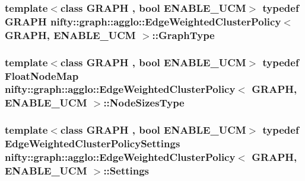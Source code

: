 \subsubsection[{Graph\+Type}]{\setlength{\rightskip}{0pt plus 5cm}template$<$class G\+R\+A\+P\+H , bool E\+N\+A\+B\+L\+E\+\_\+\+U\+C\+M$>$ typedef G\+R\+A\+P\+H {\bf nifty\+::graph\+::agglo\+::\+Edge\+Weighted\+Cluster\+Policy}$<$ G\+R\+A\+P\+H, E\+N\+A\+B\+L\+E\+\_\+\+U\+C\+M $>$\+::{\bf Graph\+Type}}\label{classnifty_1_1graph_1_1agglo_1_1EdgeWeightedClusterPolicy_a8e910f7b9d0c1baa1de7b6b1c3e58397}
\hypertarget{classnifty_1_1graph_1_1agglo_1_1EdgeWeightedClusterPolicy_a44ba54059efcb57c8c8091016fb9ee99}{}
\subsubsection[{Node\+Sizes\+Type}]{\setlength{\rightskip}{0pt plus 5cm}template$<$class G\+R\+A\+P\+H , bool E\+N\+A\+B\+L\+E\+\_\+\+U\+C\+M$>$ typedef Float\+Node\+Map {\bf nifty\+::graph\+::agglo\+::\+Edge\+Weighted\+Cluster\+Policy}$<$ G\+R\+A\+P\+H, E\+N\+A\+B\+L\+E\+\_\+\+U\+C\+M $>$\+::{\bf Node\+Sizes\+Type}}\label{classnifty_1_1graph_1_1agglo_1_1EdgeWeightedClusterPolicy_a44ba54059efcb57c8c8091016fb9ee99}
\hypertarget{classnifty_1_1graph_1_1agglo_1_1EdgeWeightedClusterPolicy_acb5f307af4f968aac09e0aa716df633a}{}
\subsubsection[{Settings}]{\setlength{\rightskip}{0pt plus 5cm}template$<$class G\+R\+A\+P\+H , bool E\+N\+A\+B\+L\+E\+\_\+\+U\+C\+M$>$ typedef {\bf Edge\+Weighted\+Cluster\+Policy\+Settings} {\bf nifty\+::graph\+::agglo\+::\+Edge\+Weighted\+Cluster\+Policy}$<$ G\+R\+A\+P\+H, E\+N\+A\+B\+L\+E\+\_\+\+U\+C\+M $>$\+::{\bf Settings}}\label{classnifty_1_1graph_1_1agglo_1_1EdgeWeightedClusterPolicy_acb5f307af4f968aac09e0aa716df633a}



